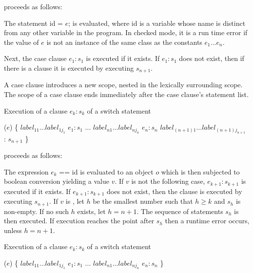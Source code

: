 \documentclass{article}
\newcommand{\code}[1]{{\sf #1}}
\begin{document}
proceeds as follows:

\LMHash{}
The statement \code{\VAR{} id = $e$;} is evaluated, where \code{id} is a variable whose name is distinct from any other variable in the program. In checked mode, it is a run time error if the value of $e$ is not an instance of the same class as the constants $e_1 \ldots e_n$.


\LMHash{}
Next, the case clause \CASE{} $e_{1}: s_{1}$ is executed if it exists. If \CASE{} $e_{1}: s_{1}$ does not exist, then if there is a  \DEFAULT{} clause it is executed by executing $s_{n+1}$.

\LMHash{}
A case clause introduces a new scope, nested in the lexically surrounding scope. The scope of a case clause ends immediately after the case clause's statement list.

\LMHash{}
Execution of a \CASE{} clause \CASE{} $e_{k}: s_{k}$ of a  switch statement

\begin{dartCode}
\SWITCH{} ($e$) \{
   $label_{11} \ldots label_{1j_1}$ \CASE{} $e_1: s_1$
   $\ldots$
   $label_{n1} \ldots label_{nj_n}$ \CASE{} $e_n: s_n$
   $label_{(n+1)1} \ldots label_{(n+1)j_{n+1}}$ \DEFAULT{}: $s_{n+1}$
\}
\end{dartCode}

proceeds as follows:

\LMHash{}
The expression \code{$e_k$ == id} is evaluated to an object $o$ which is then subjected to boolean conversion yielding a value $v$.
If $v$ is not  \TRUE{} the following case,  \CASE{} $e_{k+1}: s_{k+1}$ is executed if it exists. If  \CASE{} $e_{k+1}: s_{k+1}$ does not exist, then the \DEFAULT{} clause is executed by executing $s_{n+1}$.
If $v$ is \TRUE{},   let $h$ be the smallest number such that $h \ge k$ and $s_h$ is non-empty. If no such $h$ exists, let $h = n + 1$. The  sequence of statements $s_h$ is then executed.
If execution reaches the point after $s_h$  then  a runtime error occurs, unless $h = n+1$.

\LMHash{}
Execution of a \CASE{} clause \CASE{} $e_{k}: s_{k}$ of a  switch statement

\begin{dartCode}
\SWITCH{} ($e$) \{
   $label_{11} \ldots label_{1j_1}$ \CASE{} $e_1: s_1$
   $\ldots$
   $label_{n1} \ldots label_{nj_n}$ \CASE{} $e_n: s_n$
\}
\end{dartCode}
\end{document}
